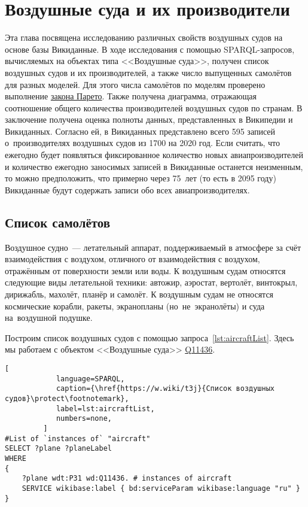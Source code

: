 \chapter{Воздушные суда и их производители}%
\label{ch:aircraft-chapter}

Эта глава посвящена исследованию различных свойств воздушных судов на основе базы Викиданные. 
В ходе исследования с помощью SPARQL-запросов, вычисляемых на объектах типа <<Воздушные суда>>, 
получен список воздушных судов и их производителей, 
а также число выпущенных самолётов для разных моделей. Для этого числа самолётов по моделям проверено выполнение \href{https://w.wiki/vDs}{закона Парето}. 
Также получена диаграмма, отражающая соотношение общего количества производителей воздушных судов по странам. 
В заключение получена оценка полноты данных, представленных в Википедии и Викиданных. 
Согласно ей, в Викиданных представлено всего 595 записей о~производителях воздушных судов из \num{1700} на 2020 год.
Если считать, что ежегодно будет появляться фиксированное количество новых авиапроизводителей 
и количество ежегодно заносимых записей в Викиданные останется неизменным, 
то можно предположить, что примерно через 75~лет (то есть в 2095 году) Викиданные будут содержать записи обо всех авиапроизводителях.

\section{Список самолётов}

Воздушное судно~--- летательный аппарат, поддерживаемый в атмосфере 
за счёт взаимодействия с воздухом, отличного от взаимодействия с воздухом, отражённым от поверхности земли или воды.
К воздушным судам относятся следующие виды летательной техники: 
автожир, аэростат, вертолёт, винтокрыл, дирижабль, махолёт, планёр и самолёт.
К воздушным судам не относятся космические корабли, ракеты, экранопланы (но~не~экранолёты) и суда на~воздушной подушке. 

Построим список воздушных судов с помощью запроса~\ref{lst:aircraftList}. 
Здесь мы работаем с объектом <<Воздушные суда>> \href{https://www.wikidata.org/wiki/Q11436}{Q11436}.

\newpage 


\begin{lstlisting}[ 
            language=SPARQL, 
            caption={\href{https://w.wiki/t3j}{Список воздушных судов}\protect\footnotemark}, 
            label=lst:aircraftList, 
            numbers=none,
         ]
#List of `instances of` "aircraft"
SELECT ?plane ?planeLabel
WHERE
{
    ?plane wdt:P31 wd:Q11436. # instances of aircraft
    SERVICE wikibase:label { bd:serviceParam wikibase:language "ru" }
}
\end{lstlisting}

